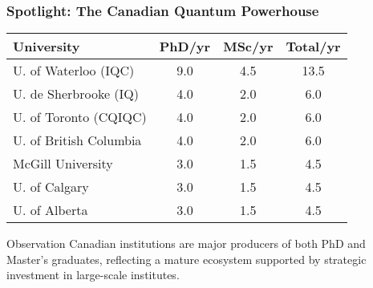 \documentclass[aspectratio=169]{beamer}
\newcommand{\tabletext}{\normalsize}
\begin{document}
\begin{frame}
    \frametitle{Spotlight: The Canadian Quantum Powerhouse}
    \subtitle{Canada's institute-driven model produces a significant, balanced talent pool.}
    
    \begin{table}
        \centering
        \tabletext
        \begin{tabularx}{\textwidth}{
            l
            S[table-format=1.1]
            S[table-format=1.1]
            S[table-format=1.1]
        }
            \toprule
            \textbf{University} & {\textbf{PhD/yr}} & {\textbf{MSc/yr}} & {\textbf{Total/yr}} \\
            \midrule
            U. of Waterloo (IQC) & 9.0 & 4.5 & 13.5 \\
            U. de Sherbrooke (IQ) & 4.0 & 2.0 & 6.0 \\
            U. of Toronto (CQIQC) & 4.0 & 2.0 & 6.0 \\
            U. of British Columbia & 4.0 & 2.0 & 6.0 \\
            McGill University & 3.0 & 1.5 & 4.5 \\
            U. of Calgary & 3.0 & 1.5 & 4.5 \\
            U. of Alberta & 3.0 & 1.5 & 4.5 \\
            \bottomrule
        \end{tabularx}
    \end{table}
    \begin{block}{Observation}
    Canadian institutions are major producers of both PhD and Master's graduates, reflecting a mature ecosystem supported by strategic investment in large-scale institutes.
    \end{block}
\end{frame}
\end{document}
